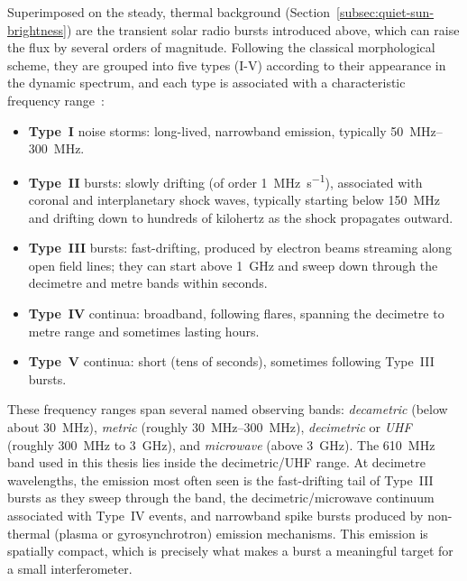 Superimposed on the steady, thermal background (Section~\ref{subsec:quiet-sun-brightness})
are the transient solar radio bursts introduced above, which can raise the
flux by several orders of magnitude. Following the classical morphological
scheme, they are grouped into five types (I-V) according to their appearance
in the dynamic spectrum, and each type is associated with a characteristic
frequency range~\citep{wild1963,mclean1985}:
\begin{itemize}[leftmargin=1.5em]
  \item \textbf{Type~I} noise storms: long-lived, narrowband emission,
        typically \SIrange{50}{300}{\mega\hertz}.
  \item \textbf{Type~II} bursts: slowly drifting (of order \SI{1}{\mega\hertz\per\second}),
        associated with coronal and interplanetary shock waves, typically
        starting below \SI{150}{\mega\hertz} and drifting down to hundreds of
        kilohertz as the shock propagates outward.
  \item \textbf{Type~III} bursts: fast-drifting, produced by electron beams
        streaming along open field lines; they can start above
        \SI{1}{\giga\hertz} and sweep down through the decimetre and metre
        bands within seconds.
  \item \textbf{Type~IV} continua: broadband, following flares, spanning the
        decimetre to metre range and sometimes lasting hours.
  \item \textbf{Type~V} continua: short (tens of seconds), sometimes following
        Type~III bursts.
\end{itemize}
These frequency ranges span several named observing bands: \emph{decametric}
(below about \SI{30}{\mega\hertz}), \emph{metric} (roughly
\SIrange{30}{300}{\mega\hertz}), \emph{decimetric} or \emph{UHF} (roughly
\SI{300}{\mega\hertz} to \SI{3}{\giga\hertz}), and \emph{microwave} (above
\SI{3}{\giga\hertz}). The \SI{610}{\mega\hertz} band used in this thesis lies
inside the decimetric/UHF range. At decimetre wavelengths, the emission most
often seen is the fast-drifting tail of Type~III bursts as they sweep through
the band, the decimetric/microwave continuum associated with Type~IV events,
and narrowband spike bursts produced by non-thermal (plasma or
gyrosynchrotron) emission mechanisms. This emission is spatially compact,
which is precisely what makes a burst a meaningful target for a small
interferometer.


